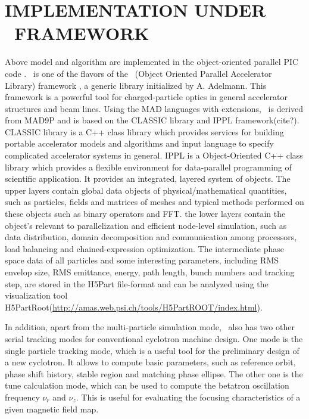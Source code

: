 \documentclass[aps,prstab,twocolumn,superscriptaddress]{revtex4}
\begin{document}
\section{IMPLEMENTATION UNDER \opal \  FRAMEWORK}

Above model and algorithm are implemented in the object-oriented parallel PIC code \opalcycl. 
\opalcycl \  is one of the flavors of the \opal \ (Object Oriented Parallel Accelerator Library) framework \cite{opal:1}, a generic library
initialized by A. Adelmann. This framework is a powerful tool for charged-particle optics in general accelerator structures and beam lines.
Using the MAD languages with extensions,
\opal \  is derived from MAD9P \cite{Ada:1} and is based on the CLASSIC \cite{Classic:1} library and IPPL framework(cite?). 
CLASSIC library is a C++ class library which provides services for building portable accelerator models and algorithms and input 
language to specify complicated accelerator systems in general. IPPL is a Object-Oriented C++ class library which provides a flexible
environment for data-parallel programming of scientific application. It provides an integrated, layered system of objects. The upper layers
contain global data objects of physical/mathematical quantities, such as particles, fields and matrices of meshes and typical methods
performed on these objects such as binary operators and FFT. the lower layers contain the object's relevant to parallelization and efficient node-level
simulation, such as data distribution, domain decomposition and communication among processors, load balancing and chained-expression optimization. 
The intermediate phase space data of all particles and some interesting parameters, 
including RMS envelop size, RMS emittance, energy, path length, bunch numbers and 
tracking step, are stored in the H5Part\cite{H5part:1} file-format and can be analyzed
using the visualization tool H5PartRoot(\url{http://amas.web.psi.ch/tools/H5PartROOT/index.html}).

In addition, apart from the multi-particle simulation mode, \opalcycl \  also has two other serial tracking modes for conventional cyclotron machine design. 
One mode is the single particle tracking mode, which is a useful tool for 
the preliminary design of a new cyclotron. It allows to compute  basic parameters, such as reference orbit, phase shift history,
stable region and matching phase ellipse. The other one is the tune calculation mode, which can be used to compute the betatron oscillation frequency 
$\nu_r$ and $\nu_z$. This is useful for evaluating 
the focusing characteristics of a given magnetic field map. 
\end{document}

